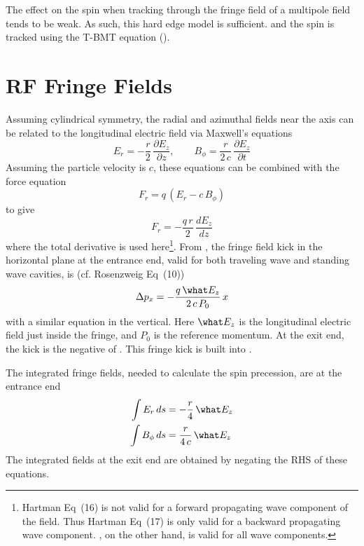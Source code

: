 The effect on the spin when tracking through the fringe field of a multipole field tends
to be weak. As such, this hard edge model is sufficient.  and the spin is tracked using
the T-BMT equation ().

\section{RF Fringe Fields}
\label{s:rf.fringe}

Assuming cylindrical symmetry, the radial and azimuthal fields near the axis 
can be related to the longitudinal electric field via Maxwell's equations\cite{b:hartman}
\begin{equation}
  E_r = -\frac{r}{2} \, \frac{\partial E_z}{\partial z}, \qquad
  B_\phi = \frac{r}{2 \, c} \, \frac{\partial E_z}{\partial t}
\end{equation}
Assuming the particle velocity is $c$, these equations can be combined with the force equation
\begin{equation}
  F_r = q \, \left( E_r - c \, B_\phi \right)
\end{equation}
to give\cite{b:rosenzweig}
\begin{equation}
  F_r = - \frac{q \, r}{2} \, \frac{d E_z}{dz}
  \label{fqr2}
\end{equation}
where the total derivative is used here\footnote
  {
Hartman\cite{b:hartman} Eq~(16) is not valid for a forward propagating wave component of
the field. Thus Hartman Eq~(17) is only valid for a backward propagating wave component. ,
on the other hand, is valid for all wave components.
  }.
From , the fringe field kick in the horizontal plane at the entrance end, valid for both
traveling wave and standing wave cavities, is (cf. Rosenzweig\cite{b:rosenzweig} Eq~(10))
\begin{equation}
  \Delta p_x = - \frac{q \, \what E_z}{2 \, c \, P_0} \, x
  \label{pqe2c}
\end{equation}
with a similar equation in the vertical. Here $\what E_z$ is the longitudinal electric field just inside
the fringe, and $P_0$ is the reference momentum. At the exit end, the kick is the negative of
. This fringe kick is built into .

The integrated fringe fields, needed to calculate the spin precession, are at the entrance end
\begin{align}
  \int E_r \, ds &= -\frac{r}{4} \, \what E_z \CRNO
  \int B_\phi \, ds &= \frac{r}{4 \, c} \, \what E_z
\end{align}
The integrated fields at the exit end are obtained by negating the RHS of these equations.
